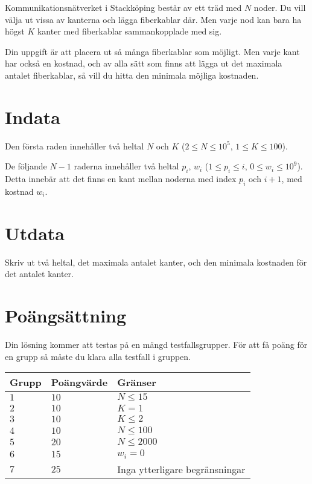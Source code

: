 
Kommunikationsnätverket i Stackköping består av ett träd med $N$ noder. Du vill välja ut vissa av
kanterna och lägga fiberkablar där. Men varje nod kan bara ha högst $K$ kanter med fiberkablar 
sammankopplade med sig. 

Din uppgift är att placera ut så många fiberkablar som möjligt. Men varje kant har också en kostnad,
och av alla sätt som finns att lägga ut det maximala antalet fiberkablar, så vill du hitta den
minimala möjliga kostnaden.

\section*{Indata}

Den första raden innehåller två heltal $N$ och $K$ ($2 \leq N \leq 10^5$, $1 \leq K \leq 100$).

De följande $N-1$ raderna innehåller två heltal $p_i$, $w_i$ ($1 \leq p_i \leq i$, $0 \leq w_i \leq 10^9$).
Detta innebär att det finns en kant mellan noderna med index $p_i$ och $i+1$, med kostnad $w_i$. 

\section*{Utdata}
Skriv ut två heltal, det maximala antalet kanter, och den minimala kostnaden för det antalet kanter.

\section*{Poängsättning}
Din lösning kommer att testas på en mängd testfallsgrupper.
För att få poäng för en grupp så måste du klara alla testfall i gruppen.

\noindent
\begin{tabular}{| l | l | p{12cm} |}
  \hline
  Grupp & Poängvärde & Gränser \\ \hline
  $1$   & $10$       & $N \leq 15$\\ \hline
  $2$   & $10$       & $K = 1$  \\ \hline
  $3$   & $10$       & $K \leq 2$ \\ \hline
  $4$   & $10$       & $N \leq 100$ \\ \hline
  $5$   & $20$       & $N \leq 2000$ \\ \hline
  $6$   & $15$       & $w_i = 0$ \\ \hline
  $7$   & $25$       & Inga ytterligare begränsningar \\ \hline
\end{tabular}
